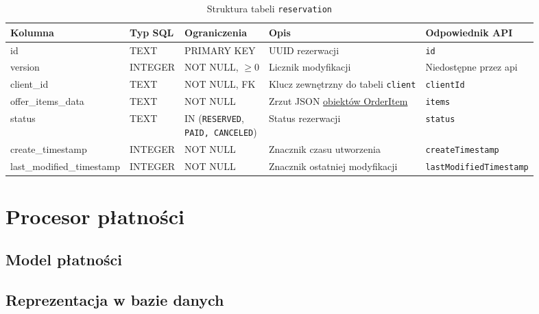 \documentclass[11pt]{article}
\begin{document}
\begin{table}[H]
  \centering
  \renewcommand{\arraystretch}{1.3}
  \begin{tabularx}{\textwidth}{|l|l|l|X|l|}
    \hline
    \textbf{Kolumna} & \textbf{Typ SQL} & \textbf{Ograniczenia} & \textbf{Opis} & \textbf{Odpowiednik API} \\
    \hline
    id & TEXT & PRIMARY KEY & UUID rezerwacji & \texttt{id} \\
    \hline
    version & INTEGER & NOT NULL, $\geq 0$ & Licznik modyfikacji & Niedostępne przez api \\
    \hline
    client\_id & TEXT & NOT NULL, FK & Klucz zewnętrzny do tabeli \texttt{client} & \texttt{clientId} \\
    \hline
    offer\_items\_data & TEXT & NOT NULL & Zrzut JSON \hyperref[schema:order-item]{obiektów OrderItem} & \texttt{items} \\
    \hline
    status & TEXT & \makecell[tl]{IN (\texttt{RESERVED}, \\ \texttt{PAID, CANCELED})} & Status rezerwacji & \texttt{status} \\
    \hline
    create\_timestamp & INTEGER & NOT NULL & Znacznik czasu utworzenia & \texttt{createTimestamp} \\
    \hline
    last\_modified\_timestamp & INTEGER & NOT NULL & Znacznik ostatniej modyfikacji & \texttt{lastModifiedTimestamp} \\
    \hline
  \end{tabularx}
  \caption{Struktura tabeli \texttt{reservation}}
  \label{tab:schema-reservation}
\end{table}



\newpage

\section{Procesor płatności}

\subsection{Model płatności}



\subsection{Reprezentacja w bazie danych}
\end{document}
